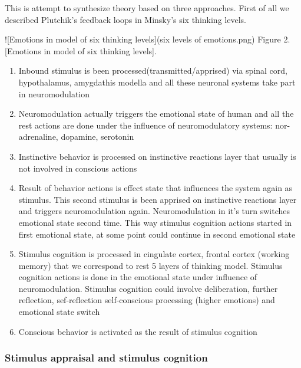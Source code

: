 This is attempt to synthesize theory based on three approaches. First of all we described Plutchik's feedback loops\cite{natureofemotions} in Minsky's six thinking levels.

![Emotions in model of six thinking levels](six levels of emotions.png)
Figure 2. [Emotions in model of six thinking levels].

\begin{enumerate}
\item  Inbound stimulus is been processed(transmitted/apprised) via spinal cord, hypothalamus, amygdathis modella and all these neuronal systems take part in neuromodulation
\item  Neuromodulation actually triggers the emotional state of human and all the rest actions are done under the influence of neuromodulatory systems: nor-adrenaline, dopamine, serotonin
\item  Instinctive behavior is processed on instinctive reactions layer that usually is not involved in conscious actions
\item  Result of behavior actions is effect state that influences the system again as stimulus. This second stimulus is been apprised on instinctive reactions layer and triggers neuromodulation again. Neuromodulation in it's turn switches emotional state second time. This way stimulus cognition actions started in first emotional state, at some point could continue in second emotional state
\item  Stimulus cognition is processed in cingulate cortex, frontal cortex (working memory) that we correspond to rest 5 layers of thinking model. Stimulus cognition actions is done in the emotional state under influence of neuromodulation. Stimulus cognition could involve deliberation, further reflection, sef-reflection self-conscious processing (higher emotions) and  emotional state switch
\item  Conscious behavior is activated as the result of stimulus cognition
\end{enumerate}

\subsubsection{Stimulus appraisal and stimulus cognition}

